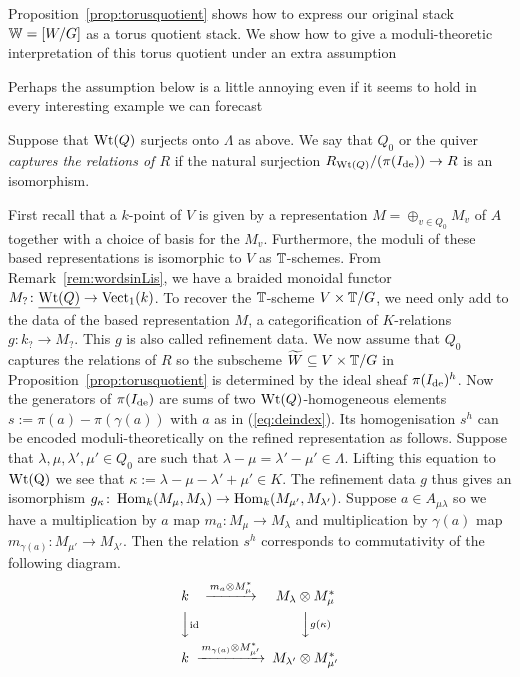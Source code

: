 \documentclass[12pt]{amsart}
\begin{document}
Proposition~\ref{prop:torusquotient} shows how to express our original stack $\mathbb{W} = [W/G]$ as a torus quotient stack. We show how to give a moduli-theoretic interpretation of this torus quotient under an extra assumption

{\red Perhaps the assumption below is a little annoying even if it seems to hold in every interesting example we can forecast}
\begin{definition}  \label{def:capturerel}
Suppose that $\textup{Wt}(Q)$ surjects onto $\Lambda$ as above. We say that $Q_0$ or the quiver {\em captures the relations of $R$} if the natural surjection $R_{\textup{Wt}(Q)}/(\pi(I_{\textup{de}})) \to R$ is an isomorphism. 
\end{definition}

First recall that a $k$-point of $V$ is given by a representation $M = \oplus_{v \in Q_0} M_v$ of $A$ together with a choice of basis for the $M_v$. Furthermore, the moduli of these based representations is isomorphic to $V$ as $\mathbb{T}$-schemes. From Remark~\ref{rem:wordsinLis}, we have a braided monoidal functor $M_? \colon \underline{\textup{Wt}(Q)} \to \operatorname{Vect}_1(k)$. To recover the $\mathbb{T}$-scheme $V \times \mathbb{T}/G$, we need only add to the data of the based representation $M$, a categorification of $K$-relations $g\colon k_? \to M_?$. This $g$ is also called refinement data. We now assume that $Q_0$ captures the relations of $R$ so the subscheme ${\widetilde{W}} \subseteq V \times \mathbb{T}/G$ in Proposition~\ref{prop:torusquotient} is determined by the ideal sheaf $\pi(I_{\textup{de}})^h$. Now the generators of $\pi(I_{\textup{de}})$ are sums of two $\textup{Wt}(Q)$-homogeneous elements $s:=\pi(a) - \pi(\gamma(a))$ with $a$ as in (\ref{eq:deindex}). Its homogenisation $s^h$ can be encoded moduli-theoretically on the refined representation as follows. Suppose that $\lambda,\mu,\lambda',\mu' \in Q_0$ are such that $\lambda - \mu = \lambda' - \mu' \in \Lambda$. Lifting this equation to $\textup{Wt(Q)}$ we see that $\kappa:= \lambda - \mu - \lambda' + \mu' \in K$. The refinement data $g$ thus gives an isomorphism $g_{\kappa} \colon \operatorname{Hom}_k(M_{\mu},M_{\lambda}) \to \operatorname{Hom}_k(M_{\mu'},M_{\lambda'})$. 
Suppose $a \in A_{\mu\lambda}$ so we have a  multiplication by $a$ map $m_a \colon M_{\mu} \to M_{\lambda}$ and multiplication by $\gamma(a)$ map $m_{\gamma(a)} \colon  M_{\mu'} \to M_{\lambda'}$. Then the relation $s^h$ corresponds to commutativity of the following diagram. 
\begin{equation}  \label{eq:refined}
\begin{CD}
k @>m_a \otimes M_{\mu}^*>> M_{\lambda} \otimes M_{\mu}^*\\
@VV\text{id}V @VVg(\kappa)V\\
k @>m_{\gamma(a)}\otimes M_{\mu'}^*>> M_{\lambda'} \otimes M_{\mu'}^*
\end{CD}
\end{equation}
\end{document}
